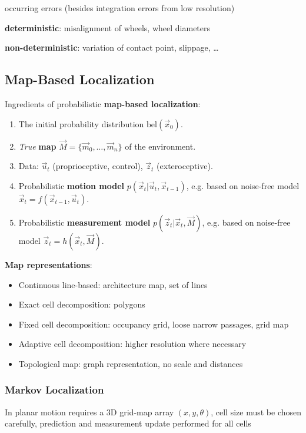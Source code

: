 \documentclass[fontsize=6pt]{scrartcl}
\begin{document}
\begin{multicols*}{4}
occurring errors (besides integration errors from low resolution)

\textbf{deterministic}: misalignment of wheels, wheel diameters

\textbf{non-deterministic}: variation of contact point, slippage, …

\subsection*{Map-Based Localization}
Ingredients of probabilistic \textbf{map-based localization}:
\begin{enumerate}
	\item The initial probability distribution $\text{bel}(\vec x_0)$.
	\item \textit{True} \textbf{map} $\vec M = \{\vec m_0, \ldots, \vec m_n\}$ of the environment.
	\item Data: $\vec u_t$ (proprioceptive, control), $\vec z_t$ (exteroceptive).
	\item Probabilistic \textbf{motion model} $p(\vec x_t|\vec u_t, \vec x_{t-1})$, e.g. based on
	noise-free model $\vec x_t = f(\vec x_{t-1}, \vec u_t)$.
	\item Probabilistic \textbf{measurement model} $p(\vec z_t|\vec x_t,\vec M)$, e.g. based on
	noise-free model $\vec z_t = h(\vec x_t, \vec M)$.
\end{enumerate}

\textbf{Map representations}:
\begin{itemize}
	\item Continuous line-based: architecture map, set of lines
	\item Exact cell decomposition: polygons
	\item Fixed cell decomposition: occupancy grid, loose narrow passages, grid map
	\item Adaptive cell decomposition: higher resolution where necessary
	\item Topological map: graph representation, no scale and distances
\end{itemize}

\subsubsection*{Markov Localization}

In planar motion requires a 3D grid-map array $(x,y,\theta)$, cell size must be chosen carefully,
prediction and measurement update performed for all cells


\end{multicols*}
\end{document}
